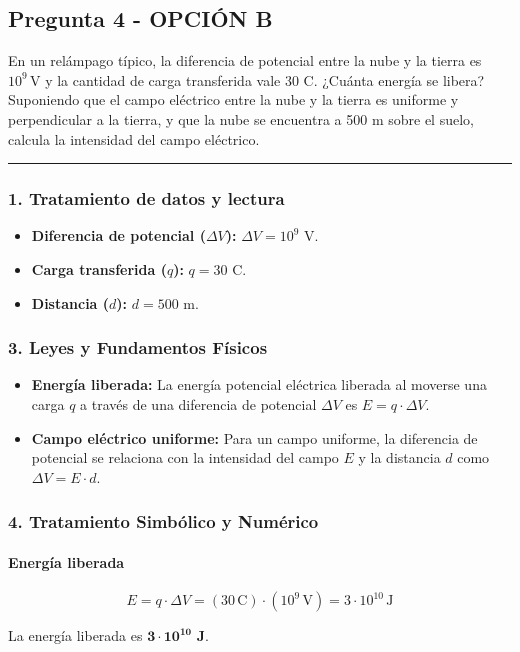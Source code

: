 \newpage

\subsection{Pregunta 4 - OPCIÓN B}
\label{subsec:4B_2004_jun_ord}

\begin{cajaenunciado}
En un relámpago típico, la diferencia de potencial entre la nube y la tierra es $10^9\,\text{V}$ y la cantidad de carga transferida vale 30 C. ¿Cuánta energía se libera? Suponiendo que el campo eléctrico entre la nube y la tierra es uniforme y perpendicular a la tierra, y que la nube se encuentra a 500 m sobre el suelo, calcula la intensidad del campo eléctrico.
\end{cajaenunciado}
\hrule

\subsubsection*{1. Tratamiento de datos y lectura}
\begin{itemize}
    \item \textbf{Diferencia de potencial ($\Delta V$):} $\Delta V = 10^9$ V.
    \item \textbf{Carga transferida ($q$):} $q = 30$ C.
    \item \textbf{Distancia ($d$):} $d = 500$ m.
\end{itemize}

\subsubsection*{3. Leyes y Fundamentos Físicos}
\begin{itemize}
    \item \textbf{Energía liberada:} La energía potencial eléctrica liberada al moverse una carga $q$ a través de una diferencia de potencial $\Delta V$ es $E = q \cdot \Delta V$.
    \item \textbf{Campo eléctrico uniforme:} Para un campo uniforme, la diferencia de potencial se relaciona con la intensidad del campo $E$ y la distancia $d$ como $\Delta V = E \cdot d$.
\end{itemize}

\subsubsection*{4. Tratamiento Simbólico y Numérico}
\paragraph*{Energía liberada}
$$E = q \cdot \Delta V = (30 \, \text{C}) \cdot (10^9 \, \text{V}) = 3 \cdot 10^{10} \, \text{J}$$
\begin{cajaresultado}
    La energía liberada es $\boldsymbol{3 \cdot 10^{10}}$ \textbf{J}.
\end{cajaresultado}


